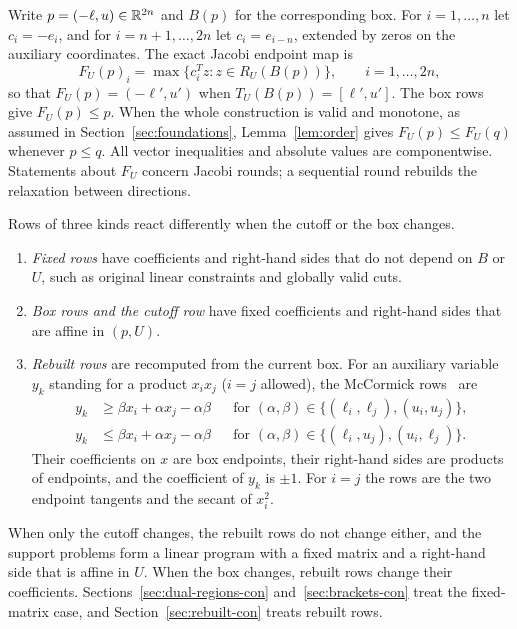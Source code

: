 Write $p=(-\ell,u)\in\mathbb{R}^{2n}$ and $B(p)$ for the corresponding box. For
$i=1,\ldots,n$ let $c_i=-e_i$, and for $i=n+1,\ldots,2n$ let
$c_i=e_{i-n}$, extended by zeros on the auxiliary coordinates. The exact
Jacobi endpoint map is
\begin{equation}\label{eq:endpoint-map-con}
 F_U(p)_i=\max\{c_i^Tz:z\in R_U(B(p))\},\qquad i=1,\ldots,2n,
\end{equation}
so that $F_U(p)=(-\ell',u')$ when $T_U(B(p))=[\ell',u']$. The box rows give
$F_U(p)\le p$. When the whole construction is valid and monotone, as
assumed in Section~\ref{sec:foundations}, Lemma~\ref{lem:order} gives
$F_U(p)\le F_U(q)$ whenever $p\le q$. All vector inequalities and absolute
values are componentwise. Statements about $F_U$ concern Jacobi rounds;
a sequential round rebuilds the relaxation between directions.

Rows of three kinds react differently when the cutoff or the box changes.
\begin{enumerate}
\item \emph{Fixed rows} have coefficients and right-hand sides that do not
 depend on $B$ or $U$, such as original linear constraints and globally
 valid cuts.
\item \emph{Box rows and the cutoff row} have fixed coefficients and
 right-hand sides that are affine in $(p,U)$.
\item \emph{Rebuilt rows} are recomputed from the current box. For an
 auxiliary variable $y_k$ standing for a product $x_ix_j$ ($i=j$ allowed),
 the McCormick
 rows~\cite{mccormick1976-computability-of-global-solutions-to} are
 \begin{equation}\label{eq:mccormick-rows-con}
 \begin{aligned}
  y_k&\ge\beta x_i+\alpha x_j-\alpha\beta
   &&\text{for }(\alpha,\beta)\in\{(\ell_i,\ell_j),(u_i,u_j)\},\\
  y_k&\le\beta x_i+\alpha x_j-\alpha\beta
   &&\text{for }(\alpha,\beta)\in\{(\ell_i,u_j),(u_i,\ell_j)\}.
 \end{aligned}
 \end{equation}
 Their coefficients on $x$ are box endpoints, their right-hand sides are
 products of endpoints, and the coefficient of $y_k$ is $\pm1$. For $i=j$
 the rows are the two endpoint tangents and the secant of $x_i^2$.
\end{enumerate}
When only the cutoff changes, the rebuilt rows do not change either, and
the support problems form a linear program with a fixed matrix and a
right-hand side that is affine in $U$. When the box changes, rebuilt rows
change their coefficients. Sections~\ref{sec:dual-regions-con}
and~\ref{sec:brackets-con} treat the fixed-matrix case, and
Section~\ref{sec:rebuilt-con} treats rebuilt rows.

